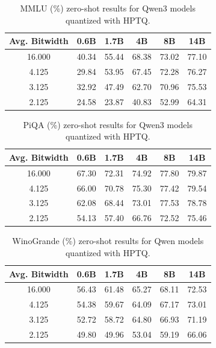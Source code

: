 \documentclass{article} %
\begin{document}
\begin{table}[htpb]
\caption{MMLU (\%) zero-shot results for Qwen3 models quantized with HPTQ.}
\label{tab:all_mmlu}
\begin{center}
\begin{tabular}{cccccc}
\toprule
Avg. Bitwidth & 0.6B & 1.7B & 4B & 8B & 14B \\
\midrule
16.000 & 40.34 & 55.44 & 68.38 & 73.02 & 77.10 \\
\midrule
4.125 & 29.84 & 53.95 & 67.45 & 72.28 & 76.27 \\
\midrule
3.125 & 32.92 & 47.49 & 62.70 & 70.96 & 75.53 \\
\midrule
2.125 & 24.58 & 23.87 & 40.83 & 52.99 & 64.31 \\
\bottomrule
\end{tabular}
\end{center}
\end{table}

\begin{table}[htpb]
\caption{PiQA (\%) zero-shot results for Qwen3 models quantized with HPTQ.}
\label{tab:all_piqa}
\begin{center}
\begin{tabular}{cccccc}
\toprule
Avg. Bitwidth & 0.6B & 1.7B & 4B & 8B & 14B \\
\midrule
16.000 & 67.30 & 72.31 & 74.92 & 77.80 & 79.87 \\
\midrule
4.125 & 66.00 & 70.78 & 75.30 & 77.42 & 79.54 \\
\midrule
3.125 & 62.08 & 68.44 & 73.01 & 77.53 & 78.78 \\
\midrule
2.125 & 54.13 & 57.40 & 66.76 & 72.52 & 75.46 \\
\bottomrule
\end{tabular}
\end{center}
\end{table}

\begin{table}[htpb]
\caption{WinoGrande (\%) zero-shot results for Qwen models quantized with HPTQ.}
\label{tab:all_winogrande}
\begin{center}
\begin{tabular}{cccccc}
\toprule
Avg. Bitwidth & 0.6B & 1.7B & 4B & 8B & 14B \\
\midrule
16.000    & 56.43  & 61.48 & 65.27 & 68.11 & 72.53 \\
\midrule
4.125 & 54.38 & 59.67 & 64.09 & 67.17 & 73.01 \\
\midrule
3.125 & 52.72 & 58.72 & 64.80 & 66.93 & 71.19 \\
\midrule
2.125 & 49.80 & 49.96 & 53.04 & 59.19 & 66.06 \\
\bottomrule
\end{tabular}
\end{center}
\end{table}
\end{document}
